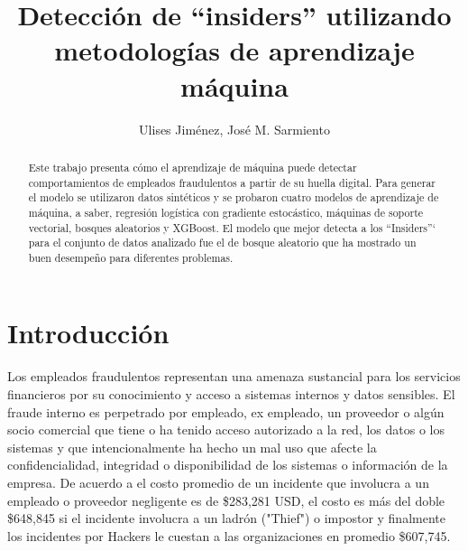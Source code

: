 \documentclass[runningheads]{llncs}
\begin{document}
\title{Detección de ``insiders'' utilizando metodologías de aprendizaje máquina}

\author{Ulises Jiménez, José M. Sarmiento}


\maketitle              

\begin{abstract}
Este trabajo presenta cómo el aprendizaje de máquina puede detectar comportamientos de empleados fraudulentos a partir de su huella digital. Para generar el modelo se utilizaron datos sintéticos y se probaron cuatro modelos de aprendizaje de máquina, a saber, regresión logística con gradiente estocástico, máquinas de soporte vectorial, bosques aleatorios y XGBoost. El modelo que mejor detecta a los ``Insiders''` para el conjunto de datos analizado fue el de bosque aleatorio que ha mostrado un buen desempeño para diferentes problemas.

\end{abstract}

\section{Introducción}
\label{sec:introduccion}

Los empleados fraudulentos representan una amenaza sustancial para los servicios financieros por su conocimiento y acceso a sistemas internos y datos sensibles. El fraude interno es perpetrado por empleado, ex empleado, un proveedor o algún socio comercial que tiene o ha tenido acceso autorizado a la red, los datos o los sistemas y que intencionalmente ha hecho un mal uso que afecte la confidencialidad, integridad o disponibilidad de los sistemas o información de la empresa. De acuerdo a \cite{insfreqcost} el costo promedio de un incidente que involucra a un empleado o proveedor negligente es de \$283,281 USD, el costo es más del doble \$648,845 si el incidente involucra a un ladrón ("Thief") o impostor y finalmente los incidentes por Hackers le cuestan a las organizaciones en promedio \$607,745.
\end{document}
